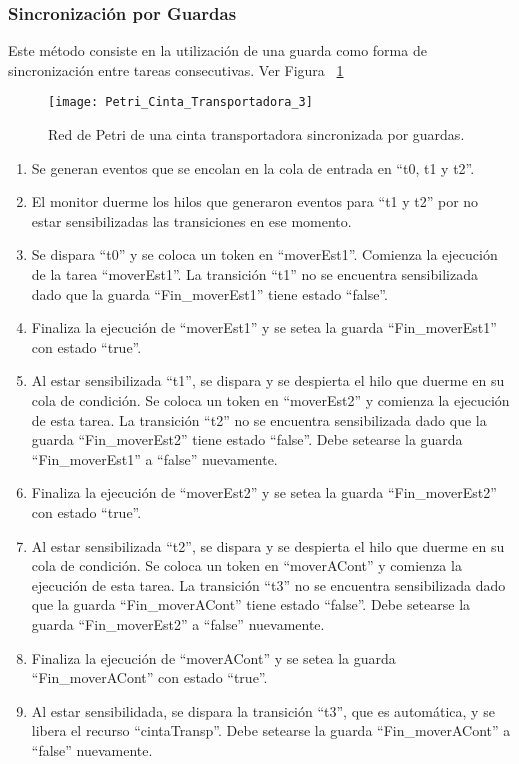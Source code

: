\subsubsection{Sincronización por Guardas}
Este método consiste en la utilización de una guarda como forma de
sincronización entre tareas consecutivas. Ver Figura ~\ref{fig:petri_cinta_transportadora_3}

\begin{figure}[H]
    \centering
    \texttt{[image: Petri\_Cinta\_Transportadora\_3]}
    \caption{Red de Petri de una cinta transportadora sincronizada por guardas.}
    \label{fig:petri_cinta_transportadora_3}
\end{figure}

\begin{enumerate}
    \item Se generan eventos que se encolan en la cola de entrada en “t0, t1 y
    t2”.
	\item El monitor duerme los hilos que generaron eventos para “t1 y t2” por
	no estar sensibilizadas las transiciones en ese momento.
	\item Se dispara ``t0'' y se coloca un token en ``moverEst1''. Comienza la
	ejecución de la tarea ``moverEst1''. La transición ``t1'' no se encuentra
	sensibilizada dado que la guarda ``Fin\_moverEst1'' tiene estado ``false''.
	\item Finaliza la ejecución de ``moverEst1'' y se setea la guarda
	``Fin\_moverEst1'' con estado ``true''.
	\item Al estar sensibilizada ``t1'', se dispara y se despierta el hilo que
	duerme en su cola de condición. Se coloca un token en ``moverEst2'' y
	comienza la ejecución de esta tarea. La transición ``t2'' no se
	encuentra sensibilizada dado que la guarda ``Fin\_moverEst2'' tiene estado
	``false''. Debe setearse la guarda ``Fin\_moverEst1'' a ``false'' nuevamente.
	\item Finaliza la ejecución de ``moverEst2'' y se setea la guarda
	``Fin\_moverEst2'' con estado ``true''.
	\item Al estar sensibilizada ``t2'', se dispara y se despierta el hilo que
	duerme en su cola de condición. Se coloca un token en ``moverACont'' y
	comienza la ejecución de esta tarea. La transición ``t3'' no se
	encuentra sensibilizada dado que la guarda ``Fin\_moverACont'' tiene estado
	``false''. Debe setearse la guarda ``Fin\_moverEst2'' a ``false'' nuevamente.
	\item Finaliza la ejecución de ``moverACont'' y se setea la guarda
	``Fin\_moverACont'' con estado ``true''.
	\item Al estar sensibilidada, se dispara la transición ``t3'', que es
	automática, y se libera el recurso ``cintaTransp''. Debe setearse la guarda
	``Fin\_moverACont'' a ``false'' nuevamente.
\end{enumerate}

